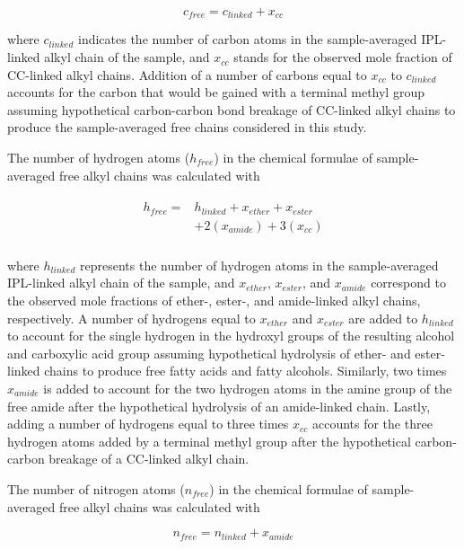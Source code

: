 \begin{equation}
    c_{free} = c_{linked} + x_{cc}
\end{equation}

\noindent where $c_{linked}$ indicates the number of carbon atoms in the sample-averaged IPL-linked alkyl chain of the sample, and $x_{cc}$ stands for the observed mole fraction of CC-linked alkyl chains. Addition of a number of carbons equal to $x_{cc}$ to $c_{linked}$ accounts for the carbon that would be gained with a terminal methyl group assuming hypothetical carbon-carbon bond breakage of CC-linked alkyl chains to produce the sample-averaged free chains considered in this study.

The number of hydrogen atoms ($h_{free}$) in the chemical formulae of sample-averaged free alkyl chains was calculated with

\begin{align}
\begin{split}
    h_{free} = &h_{linked} + x_{ether} + x_{ester}\\
        & + 2(x_{amide}) + 3(x_{cc}) \\
\end{split}
\end{align}

\noindent where $h_{linked}$ represents the number of hydrogen atoms in the sample-averaged IPL-linked alkyl chain of the sample, and $x_{ether}$, $x_{ester}$, and $x_{amide}$ correspond to the observed mole fractions of ether-, ester-, and amide-linked alkyl chains, respectively. A number of hydrogens equal to $x_{ether}$ and $x_{ester}$ are added to $h_{linked}$ to account for the single hydrogen in the hydroxyl groups of the resulting alcohol and carboxylic acid group assuming hypothetical hydrolysis of ether- and ester-linked chains to produce free fatty acids and fatty alcohols. Similarly, two times $x_{amide}$ is added to account for the two hydrogen atoms in the amine group of the free amide after the hypothetical hydrolysis of an amide-linked chain. Lastly, adding a number of hydrogens equal to three times $x_{cc}$ accounts for the three hydrogen atoms added by a terminal methyl group after the hypothetical carbon-carbon breakage of a CC-linked alkyl chain.

The number of nitrogen atoms ($n_{free}$) in the chemical formulae of sample-averaged free alkyl chains was calculated with

\begin{equation}
    n_{free} = n_{linked} + x_{amide}
\end{equation}

